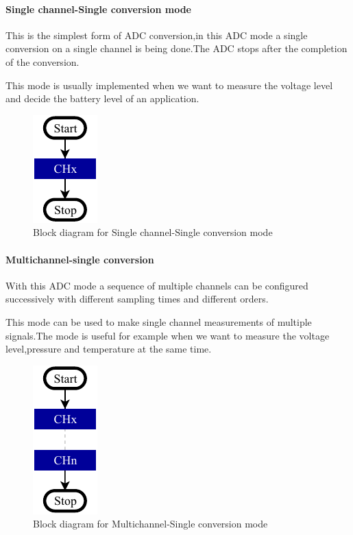 \documentclass[a4paper, 11pt, openany, oneside, english]{book}
\begin{document}
\paragraph{Single channel-Single conversion mode}
This is the simplest form of ADC conversion,in this ADC mode a single conversion on a single channel is being done.The ADC stops after the completion of the conversion. \newline

This mode is usually implemented when we want to measure the voltage level and decide the battery level of an application.


\begin{figure}[b]
\centering
\includegraphics[width= 0.2\linewidth]{HS_STM32-single-channel-single-conversion-mode.pdf}
\caption{Block diagram for Single channel-Single conversion mode}
\end{figure}

\newpage
\paragraph{Multichannel-single conversion}



With this ADC mode a sequence of multiple channels can be configured successively  with different sampling times and different orders.

This mode can be used to make single channel measurements of multiple signals.The mode is useful for example when we want to measure the voltage level,pressure and temperature at the same time. 



\begin{figure}[b]
\centering
\includegraphics[width= 0.2\linewidth]{HS_STM32-single-channel_multi-single-conversion.pdf}
\caption{Block diagram for Multichannel-Single conversion mode}
\end{figure}
\end{document}

